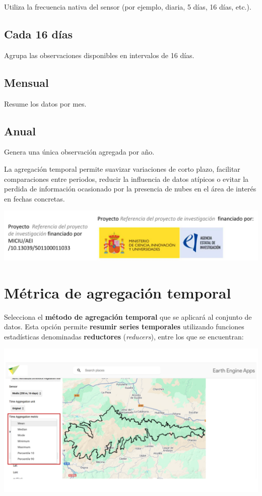 \documentclass[
]{book}
\begin{document}
Utiliza la frecuencia nativa del sensor (por ejemplo, diaria, 5 días, 16 días, etc.).

\section{\texorpdfstring{\textbf{Cada 16 días}}{Cada 16 días}}\label{cada-16-duxedas}

Agrupa las observaciones disponibles en intervalos de 16 días.

\section{\texorpdfstring{\textbf{Mensual}}{Mensual}}\label{mensual}

Resume los datos por mes.

\section{\texorpdfstring{\textbf{Anual}}{Anual}}\label{anual}

Genera una única observación agregada por año.

La agregación temporal permite suavizar variaciones de corto plazo, facilitar
comparaciones entre periodos, reducir la influencia de datos atípicos o evitar la
perdida de información ocasionado por la presencia de nubes en el área de interés en
fechas concretas.

\includegraphics{assets/logo.jpeg}

\chapter{Métrica de agregación temporal}\label{agregacion-temporal}

Selecciona el \textbf{método de agregación temporal} que se aplicará al conjunto de datos. Esta opción permite \textbf{resumir series temporales} utilizando funciones estadísticas denominadas \textbf{reductores} (\emph{reducers}), entre los que se encuentran:

\includegraphics{assets/aggregationTime.png}
\end{document}
